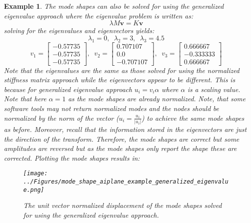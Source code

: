 \documentclass[12pt,letter]{article}
\newtheorem{ex}{Example}
\numberwithin{ex}{section} %
\newenvironment{example}{\begin{mdframed}[middlelinewidth=0.5mm]\begin{ex}\normalfont}{\end{ex}\end{mdframed}}
\numberwithin{re}{section} %
\begin{document}
\begin{example}
The mode shapes can also be solved for using the generalized eigenvalue approach where the eigenvalue problem is written as:
\begin{equation}
\lambda M \textbf{v} = K \textbf{v}
\end{equation}
solving for the eigenvalues and eigenvectors yields:
\begin{equation}
\lambda_1 = 0, \; \; \lambda_2 = 3, \; \; \lambda_3 = 4.5
\end{equation}
\begin{equation}
v_1 = \begin{bmatrix} -0.57735 \\    -0.57735 \\   -0.57735  \end{bmatrix}, \; \; v_2 = \begin{bmatrix} 0.707107 \\    0.0 \\    -0.707107 \end{bmatrix}, \; \; v_3 = \begin{bmatrix} 0.666667 \\    -0.333333 \\    0.666667  \end{bmatrix}
\end{equation}
Note that the eigenvalues are the same as those solved for using the normalized stiffness matrix approach while the eigenvectors appear to be different. This is because for generalized eigenvalue approach $u_i=v_i \alpha$ where $\alpha$ is a scaling value. Note that here $\alpha=1$ as the mode shapes are already normalized. Note, that some software tools may not return normalized modes and the nodes should be normalized by the norm of the vector ($u_i = \frac{u_i}{|u_i|}$) to achieve the same mode shapes as before. Moreover, recall that the information stored in the eigenvectors are just the direction of the transform. Therefore, the mode shapes are correct but some amplitudes are reversed but as the mode shapes only report the shape these are corrected.  Plotting the mode shapes results in:

\begin{figure}[H]
	\centering
	\texttt{[image: ../Figures/mode\_shape\_aiplane\_example\_generalized\_eigenvalue.png]}
	\caption{The unit vector normalized displacement of the mode shapes solved for using the generalized eigenvalue approach.}
	\label{fig:mode_shape_aiplane_example_generalized_eigenvalue}
\end{figure}



\end{example}
\end{document}
